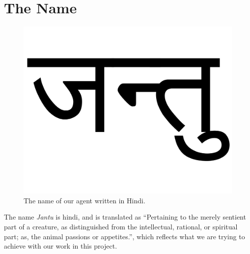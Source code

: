 \section{The Name}
\label{sec:name}
\begin{figure}[h!tb]
\centering
\includegraphics[scale=0.25]{graphics/jantu.pdf}
\caption{The name of our agent written in Hindi.}
\label{fig:name}
\end{figure}
The name {\em Jantu} is hindi, and is translated as ``Pertaining to the merely sentient part of a creature, as distinguished from the intellectual, rational, or spiritual part; as, the animal passions or appetites.''\cite{hindijantu}, which reflects what we are trying to achieve with our work in this project.

